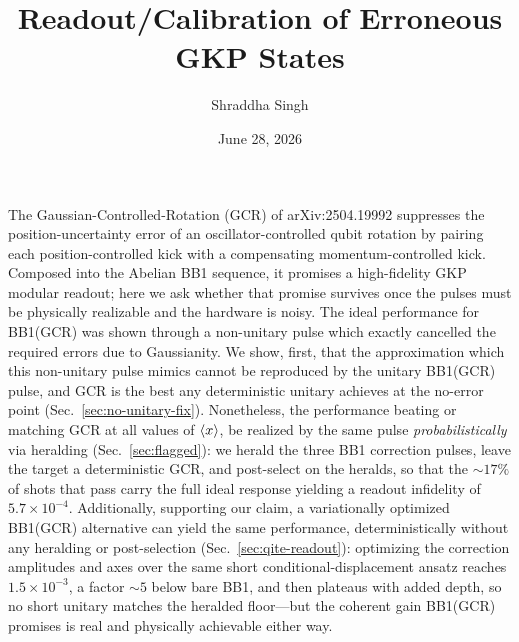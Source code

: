 \documentclass[11pt]{article}
\title{\textbf{Readout/Calibration of Erroneous GKP States}}
\author{Shraddha Singh}
\date{June 28, 2026}
\begin{document}
\maketitle

\noindent The Gaussian-Controlled-Rotation (GCR) of arXiv:2504.19992
suppresses the position-uncertainty error of an
oscillator-controlled qubit rotation by pairing each position-controlled kick with a compensating
momentum-controlled kick. Composed into the Abelian BB1 sequence, it promises a high-fidelity GKP
modular readout; here we ask whether that promise survives once the pulses must be physically
realizable and the hardware is noisy. The ideal performance for BB1(GCR) was shown through a non-unitary pulse which exactly cancelled the required errors due to Gaussianity. We show, first, that the approximation which this non-unitary pulse mimics cannot be reproduced by the unitary BB1(GCR) pulse, and GCR is the best any deterministic unitary achieves
at the no-error point (Sec.~\ref{sec:no-unitary-fix}). Nonetheless, the performance beating or matching GCR at all values of $\braket{x}$, be realized by the same pulse
\emph{probabilistically} via heralding (Sec.~\ref{sec:flagged}): we herald the three BB1 correction
pulses, leave the target a deterministic GCR, and post-select on the heralds, so that the
$\sim\!17\%$ of shots that pass carry the full ideal response yielding a readout infidelity of $5.7\times 10^{-4}$. Additionally, supporting our claim, a variationally optimized BB1(GCR)
alternative can yield the same performance, deterministically without any heralding or post-selection (Sec.~\ref{sec:qite-readout}): optimizing the correction amplitudes and axes over the
same short conditional-displacement ansatz reaches $1.5\times10^{-3}$, a factor $\sim\!5$ below bare
BB1, and then plateaus with added depth, so no short unitary matches the heralded floor---but the
coherent gain BB1(GCR) promises is real and physically achievable either way.
\end{document}
